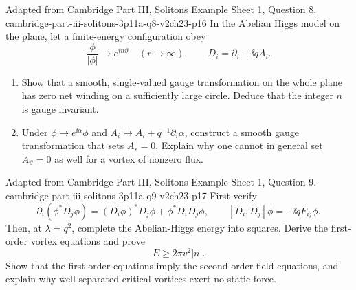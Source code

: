 \begin{enumerate}
  {Adapted from Cambridge Part III, Solitons Example Sheet 1, Question 8.}
  {cambridge-part-iii-solitons-3p11a-q8-v2ch23-p16}
  In the Abelian Higgs model on the plane, let a finite-energy configuration
  obey
  \[
    \frac{\phi}{|\phi|}\longrightarrow e^{in\vartheta}
    \quad (r\longrightarrow\infty),\qquad
    D_i=\partial_i-\ii qA_i .
  \]
  \begin{enumerate}
    \item[(a)] Show that a smooth, single-valued gauge transformation on the
      whole plane has zero net winding on a sufficiently large circle.
      Deduce that the integer \(n\) is gauge invariant.
    \item[(b)] Under
      \(\phi\mapsto e^{\ii\alpha}\phi\) and
      \(A_i\mapsto A_i+q^{-1}\partial_i\alpha\), construct a smooth gauge
      transformation that sets \(A_r=0\).  Explain why one cannot in
      general set \(A_\vartheta=0\) as well for a vortex of nonzero flux.
  \end{enumerate}

  {Adapted from Cambridge Part III, Solitons Example Sheet 1, Question 9.}
  {cambridge-part-iii-solitons-3p11a-q9-v2ch23-p17}
  First verify
  \[
    \partial_i(\phi^*D_j\phi)
      =(D_i\phi)^*D_j\phi+\phi^*D_iD_j\phi,
    \qquad [D_i,D_j]\phi=-\ii qF_{ij}\phi .
  \]
  Then, at \(\lambda=q^2\), complete the Abelian-Higgs energy into squares.
  Derive the first-order vortex equations and prove
  \[
    E\geq2\pi v^2|n|.
  \]
  Show that the first-order equations imply the second-order field
  equations, and explain why well-separated critical vortices exert no
  static force.


\end{enumerate}
